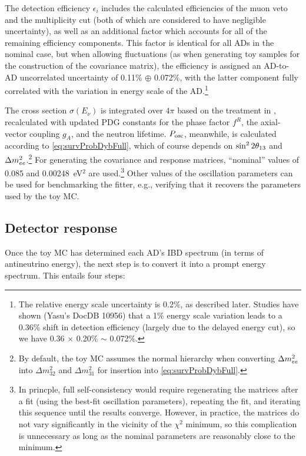 \documentclass[../thesis.tex]{subfiles}
\begin{document}
The detection efficiency $\epsilon_i$ includes the calculated efficiencies of the muon veto and the multiplicity cut (both of which are considered to have negligible uncertainty), as well as an additional factor which accounts for all of the remaining efficiency components. This factor is identical for all ADs in the nominal case, but when allowing fluctuations (as when generating toy samples for the construction of the covariance matrix), the efficiency is assigned an AD-to-AD uncorrelated uncertainty of 0.11\% $\oplus$ 0.072\%, with the latter component fully correlated with the variation in energy scale of the AD.\footnote{The relative energy scale uncertainty is 0.2\%, as described later. Studies have shown (Yasu's DocDB 10956) that a 1\% energy scale variation leads to a 0.36\% shift in detection efficiency (largely due to the delayed energy cut), so we have 0.36 $\times$ 0.20\% $\sim$ 0.072\%.}

The cross section $\sigma(E_\nu)$ is integrated over $4\pi$ based on the treatment in \cite{Vogel_1999}, recalculated with updated PDG constants for the phase factor $f^R$, the axial-vector coupling $g_A$, and the neutron lifetime. $P_\mathrm{osc}$, meanwhile, is calculated according to \autoref{eq:survProbDybFull}, which of course depends on $\sin^2 2\theta_{13}$ and $\Delta m^2_{ee}$.\footnote{By default, the toy MC assumes the normal hierarchy when converting $\Delta m^2_{ee}$ into $\Delta m^2_{32}$ and $\Delta m^2_{31}$ for insertion into \autoref{eq:survProbDybFull}.} For generating the covariance and response matrices, ``nominal'' values of 0.085 and 0.00248~eV$^2$ are used.\footnote{In princple, full self-consistency would require regenerating the matrices after a fit (using the best-fit oscillation parameters), repeating the fit, and iterating this sequence until the results converge. However, in practice, the matrices do not vary significantly in the vicinity of the $\chi^2$ minimum, so this complication is unnecessary as long as the nominal parameters are reasonably close to the minimum.} Other values of the oscillation parameters can be used for benchmarking the fitter, e.g., verifying that it recovers the parameters used by the toy MC.

\subsection{Detector response}
\label{sec:fitToyDetResponse}

Once the toy MC has determined each AD's IBD spectrum (in terms of antineutrino energy), the next step is to convert it into a prompt energy spectrum. This entails four steps:
\end{document}
